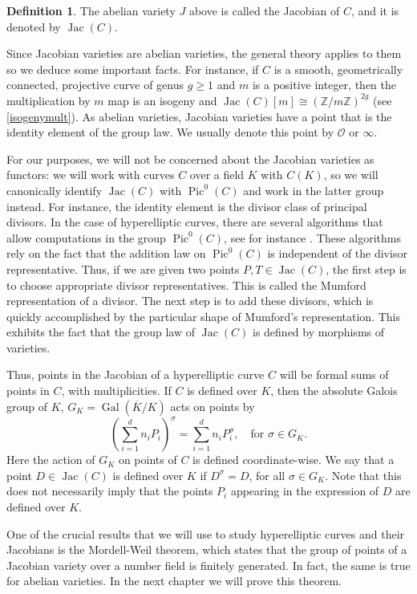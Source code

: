 \documentclass[a4paper, 12pt]{amsart}
\theoremstyle{definition}
\newtheorem{defn0}{Definition}[section]
\theoremstyle{plain}
\theoremstyle{plain}
\theoremstyle{plain}
\theoremstyle{plain}
\theoremstyle{remark}
\theoremstyle{remark}
\theoremstyle{plain}
\newenvironment{definition}{ \begin{defn0}}{\end{defn0}}
\newcommand{\Zmod}[1]{\mathbb{Z}/#1\mathbb{Z}}
\DeclareMathOperator{\Pic}{Pic}
\DeclareMathOperator{\Jac}{Jac}
\DeclareMathOperator{\Gal}{Gal}
\begin{document}
	\begin{definition}
		The abelian variety $J$ above is called the Jacobian of $C$, and it is denoted by $\Jac(C)$.
	\end{definition}
	Since Jacobian varieties are abelian varieties, the general theory applies to them so we deduce some important facts. For instance, if $C$ is a smooth, geometrically connected, projective curve of genus $g\ge 1$ and $m$ is a positive integer, then the multiplication by $m$ map is an isogeny and $\Jac(C)[m]\cong\left(\Zmod{m}\right)^{2g}$ (see \ref{isogenymult}). As abelian varieties, Jacobian varieties have a point that is the identity element of the group law. We usually denote this point by $\mathcal{O}$ or $\infty$.
	
	For our purposes, we will not be concerned about the Jacobian varieties as functors: we will work with curves $C$ over a field $K$ with $C(K)$, so we will canonically identify $\Jac(C)$ with $\Pic^0(C)$ and work in the latter group instead. For instance, the identity element is the divisor class of principal divisors. In the case of hyperelliptic curves, there are several algorithms that allow computations in the group $\Pic^0(C)$, see for instance \cite{Cantor_1987}. These algorithms rely on the fact that the addition law on $\Pic^0(C)$ is independent of the divisor representative. Thus, if we are given two points $P,T\in\Jac(C)$, the first step is to choose appropriate divisor representatives. This is called the Mumford representation of a divisor. The next step is to add these divisors, which is quickly accomplished by the particular shape of Mumford's representation. This exhibits the fact that the group law of $\Jac(C)$ is defined by morphisms of varieties.
	
	Thus, points in the Jacobian of a hyperelliptic curve $C$ will be formal sums of points in $C$, with multiplicities. If $C$ is defined over $K$, then the absolute Galois group of $K$, $G_K=\Gal(\overline{K}/K)$ acts on points by
	\begin{equation*}
		\left(\sum_{i=1}^d n_iP_i\right)^\sigma=\sum_{i=1}^dn_iP_i^\sigma,\quad \text{for }\sigma\in G_K.
	\end{equation*}
	Here the action of $G_K$ on points of $C$ is defined coordinate-wise. We say that a point $D\in\Jac(C)$ is defined over $K$ if $D^\sigma=D$, for all $\sigma\in G_K$. Note that this does not necessarily imply that the points $P_i$ appearing in the expression of $D$ are defined over $K$.
	
	One of the crucial results that we will use to study hyperelliptic curves and their Jacobians is the Mordell-Weil theorem, which states that the group of points of a Jacobian variety over a number field is finitely generated. In fact, the same is true for abelian varieties. In the next chapter we will prove this theorem.
	
\end{document}
